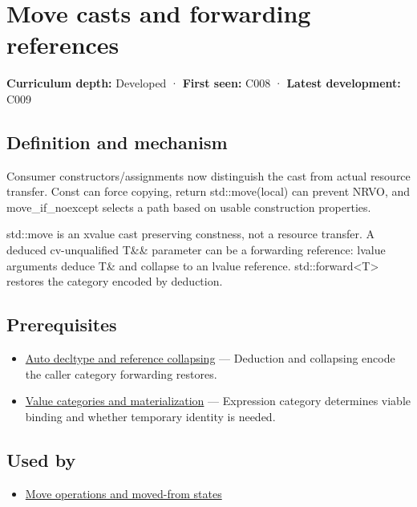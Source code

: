 \hypertarget{appendix-0104b704fb11}{}\label{referencestart:appendix-0104b704fb11}
\section{Move casts and forwarding references}\label{appendix-0104b704fb11-move-casts-and-forwarding-references}

\textbf{Curriculum depth:} Developed · \textbf{First seen:} C008 · \textbf{Latest development:} C009

\subsection{Definition and mechanism}\label{appendix-0104b704fb11-definition-and-mechanism}

Consumer constructors/assignments now distinguish the cast from actual resource transfer. Const can force copying, return std::move(local) can prevent NRVO, and move\_if\_noexcept selects a path based on usable construction properties.

std::move is an xvalue cast preserving constness, not a resource transfer. A deduced cv-unqualified T\&\& parameter can be a forwarding reference: lvalue arguments deduce T\& and collapse to an lvalue reference. std::forward\textless T\textgreater{} restores the category encoded by deduction.

\subsection{Prerequisites}\label{appendix-0104b704fb11-prerequisites}

\begin{itemize}
\tightlist
\item
  \hyperref[appendix-5d4252a42886]{Auto decltype and reference collapsing} --- Deduction and collapsing encode the caller category forwarding restores.
\item
  \hyperref[appendix-1121b30eaeb0]{Value categories and materialization} --- Expression category determines viable binding and whether temporary identity is needed.
\end{itemize}

\subsection{Used by}\label{appendix-0104b704fb11-used-by}

\begin{itemize}
\tightlist
\item
  \hyperref[appendix-5636651017c2]{Move operations and moved-from states}
\end{itemize}

